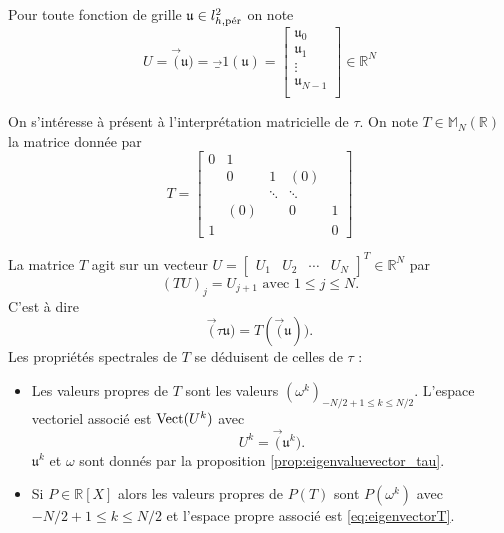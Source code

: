 Pour toute fonction de grille $\mathfrak{u} \in l^2_{h,\per}$ on note
\begin{equation}
U = \vec( \mathfrak{u} ) = \vec_1( \mathfrak{u} ) = \begin{bmatrix}
\mathfrak{u}_0\\
\mathfrak{u}_1\\
\vdots\\
\mathfrak{u}_{N-1}\\
\end{bmatrix} \in \mathbb{R}^N
\end{equation}

On s'intéresse à présent à l'interprétation matricielle de $\tau$. On note $T \in \mathbb{M}_N (\mathbb{R})$ la matrice donnée par
\begin{equation}
T = \begin{bmatrix}
0 & 1 &   &   &   \\ 
  & 0 & 1 & (0) &   \\ 
  &   & \ddots & \ddots &   \\ 
  & (0) &   & 0 & 1 \\ 
1 &   &   &   & 0
\end{bmatrix} 
\label{eq:matrice_translation}
\end{equation}

La matrice $T$ agit sur un vecteur $U = \begin{bmatrix}
U_1 & U_2 & \cdots & U_{N} 
\end{bmatrix}^T \in \mathbb{R}^N $ par
\begin{equation}
(TU)_j = U_{j+1} \text{ avec } 1 \leq j \leq N.
\end{equation}
C'est à dire
\begin{equation}
\vec ( \tau \mathfrak{u} ) = T ( \vec ( \mathfrak{u} ) ). 
\end{equation}
Les propriétés spectrales de $T$ se déduisent de celles de $\tau$ :
\begin{corollaire}
\begin{itemize}
\item Les valeurs propres de $T$ sont les valeurs $(\omega^k)_{-N/2+1 \leq k \leq N/2}$. 
L'espace vectoriel associé est $\Vect ( U^k )$ avec
\begin{equation}
U^k = \vec (\mathfrak{u}^k ).
\label{eq:eigenvectorT}
\end{equation}
$\mathfrak{u}^k$ et $\omega$ sont donnés par la proposition \ref{prop:eigenvaluevector_tau}.

\item Si $P \in \mathbb{R}[X]$ alors les valeurs propres de $P(T)$ sont $P(\omega^k)$ avec $-N/2 + 1 \leq k \leq N/2$ et l'espace propre associé est \eqref{eq:eigenvectorT}.
\end{itemize}
\label{prop:eigen_P(T)}
\end{corollaire}

